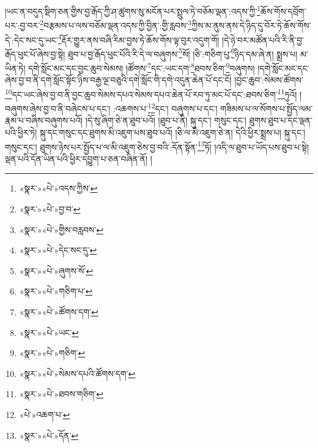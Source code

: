 །ཡང་ན་བདུད་སྡིག་ཅན་གྱིས་བྱ་རྒོད་ཀྱི་ཤ་ཚུགས་སུ་མངོན་པར་སྤྲུལ་ཏེ་བཅོམ་ལྡན་:འདས་ཀྱི་\footnote{«སྣར་»«པེ་»འདས་ཀྱིས་}ཆོས་གོས་དབྲོག་པར་:བྱ་བར་\footnote{«སྣར་»«པེ་»བྱ་བ་}བརྩམས་པ་ལས་བཅོམ་ལྡན་འདས་ཀྱི་བྱིན་:གྱི་རླབས་\footnote{«སྣར་»«པེ་»གྱིས་བརླབས་}ཀྱིས་མ་ནུས་ནས་དེ་ཉིད་དུ་བོར་ཏེ་ཆོས་གོས་དེ་:དེང་སང་དུ་ཡང་\footnote{«སྣར་»«པེ་»དེང་སང་དུ་}རྡོར་གྱུར་ནས་བཞི་རིམ་བྱས་ཏེ་ཆོས་གོས་ལྟ་བུར་འདུག་གོ། །དེ་ཉེ་བར་མཚོན་པའི་རི་ནི་བྱ་རྒོད་ཕུང་པོ་ཞེས་བྱ་སྟེ། ཐུབ་པ་བྱ་རྒོད་ཕུང་པོའི་རི་དེ་ལ་བཞུགས་\footnote{«སྣར་»«པེ་»ཞུགས་སོ་}སོ། །ཅི་:གཅིག་པུ་\footnote{«སྣར་»«པེ་»གཅིག་པ་}ཉིད་དམ་ཞེ་ན། སྨྲས་པ། མ་ཡིན་ཏེ། དགེ་སློང་མང་དང་བྱང་ཆུབ་སེམས། །ཚོགས་\footnote{«སྣར་»«པེ་»ཚོགས་དག་}དང་:ཡང་དག་\footnote{«སྣར་»«པེ་»ཡང་}ཐབས་ཅིག་\footnote{«སྣར་»«པེ་»གཅིག་}བཞུགས། །དགེ་སློང་མང་དང་ཞེས་བྱ་བ་ནི་དགེ་སློང་སྟོང་ཉིས་བརྒྱ་ལྔ་བཅུའི་དགེ་སློང་གི་དགེ་འདུན་ཆེན་པོ་དང་ངོ། །བྱང་ཆུབ་:སེམས་ཚོགས་\footnote{«སྣར་»«པེ་»སེམས་དཔའི་ཚོགས་དག་}དང་ཡང་ཞེས་བྱ་བ་ནི་བྱང་ཆུབ་སེམས་དཔའ་སེམས་དཔའ་ཆེན་པོ་རབ་ཏུ་མང་པོ་དང་:ཐབས་ཅིག་\footnote{«སྣར་»«པེ་»ཐབས་གཅིག་}ཏུའོ། །བཞུགས་ཞེས་བྱ་བ་ནི་བཞེངས་པ་དང་། :འཆགས་པ་\footnote{«པེ་»འཆག་པ་}དང་། བཞུགས་པ་དང་། གཟིམས་པ་ལ་སོགས་པ་སྤྱོད་ལམ་རྣམ་པ་བཞིས་བཞུགས་པའོ། །དེ་སུ་ཞིག་ཅེ་ན་ཐུབ་པའོ། །ཐུབ་པ་ནི། སྐུ་དང་། གསུང་དང་། ཐུགས་ཐུབ་པ་དང་ལྡན་པའི་ཕྱིར་ཏེ། སྐུ་དང་གསུང་དང་ཐུགས་མི་འཇུག་པས་ཐུབ་པའོ། །ཅི་ལ་མི་འཇུག་ཅེ་ན། དེའི་ཕྱིར་སྨྲས་པ། སྐུ་དང་། གསུང་དང་། ཐུགས་ཉེས་པར་སྤྱོད་པ་ལ་མི་འཇུག་ཅེས་བྱ་བའི་:དོན་སྟོན་\footnote{«སྣར་»«པེ་»དོན་}ཏོ། །འདི་ལ་ཐུབ་པ་ཡོད་པས་ཐུབ་པ་སྟེ། ལྡན་པའི་དོན་ཡིན་པའི་ཕྱིར་དབྱུག་པ་ཅན་བཞིན་ནོ། །
